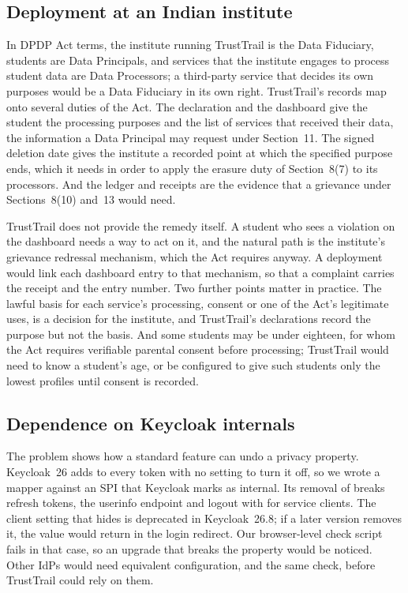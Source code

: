 \subsection{Deployment at an Indian institute}
In DPDP Act terms, the institute running TrustTrail is the Data Fiduciary, students are Data Principals, and services that the institute engages to process student data are Data Processors; a third-party service that decides its own purposes would be a Data Fiduciary in its own right. TrustTrail's records map onto several duties of the Act. The declaration and the dashboard give the student the processing purposes and the list of services that received their data, the information a Data Principal may request under Section~11. The signed deletion date gives the institute a recorded point at which the specified purpose ends, which it needs in order to apply the erasure duty of Section~8(7) to its processors. And the ledger and receipts are the evidence that a grievance under Sections~8(10) and~13 would need.

TrustTrail does not provide the remedy itself. A student who sees a violation on the dashboard needs a way to act on it, and the natural path is the institute's grievance redressal mechanism, which the Act requires anyway. A deployment would link each dashboard entry to that mechanism, so that a complaint carries the receipt and the entry number. Two further points matter in practice. The lawful basis for each service's processing, consent or one of the Act's legitimate uses, is a decision for the institute, and TrustTrail's declarations record the purpose but not the basis. And some students may be under eighteen, for whom the Act requires verifiable parental consent before processing; TrustTrail would need to know a student's age, or be configured to give such students only the lowest profiles until consent is recorded.

\subsection{Dependence on Keycloak internals}
The  problem shows how a standard feature can undo a privacy property. Keycloak~26 adds  to every token with no setting to turn it off, so we wrote a mapper against an SPI that Keycloak marks as internal. Its removal of  breaks refresh tokens, the userinfo endpoint and logout with  for service clients. The client setting that hides  is deprecated in Keycloak~26.8; if a later version removes it, the value would return in the login redirect. Our browser-level check script fails in that case, so an upgrade that breaks the property would be noticed. Other IdPs would need equivalent configuration, and the same check, before TrustTrail could rely on them.

